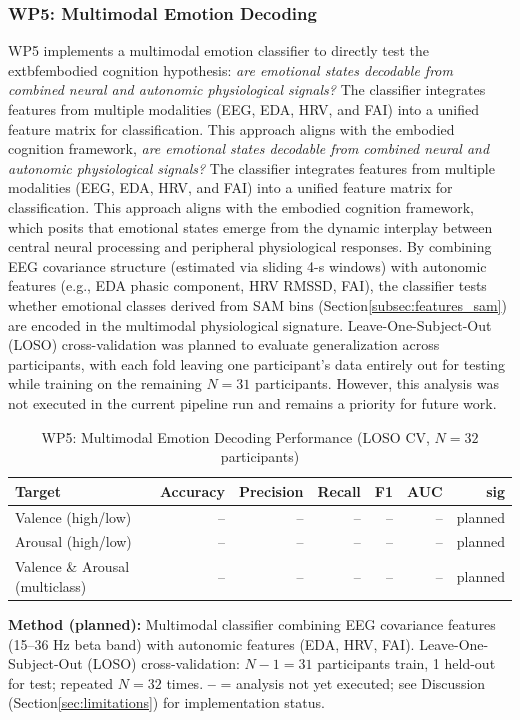 \subsubsection{WP5: Multimodal Emotion Decoding}
\label{subsec:wp5_multimodal_decoding}

WP5 implements a multimodal emotion classifier to directly test the 	extbf{embodied cognition hypothesis}: \emph{are emotional states decodable from combined neural and autonomic physiological signals?} The classifier integrates features from multiple modalities (EEG, EDA, HRV, and FAI) into a unified feature matrix for classification. This approach aligns with the embodied cognition framework, \emph{are emotional states decodable from combined neural and autonomic physiological signals?} The classifier integrates features from multiple modalities (EEG, EDA, HRV, and FAI) into a unified feature matrix for classification. This approach aligns with the embodied cognition framework, which posits that emotional states emerge from the dynamic interplay between central neural processing and peripheral physiological responses. By combining EEG covariance structure (estimated via sliding 4-s windows) with autonomic features (e.g., EDA phasic component, HRV RMSSD, FAI), the classifier tests whether emotional classes derived from SAM bins (Section\ref{subsec:features_sam}) are encoded in the multimodal physiological signature. Leave-One-Subject-Out (LOSO) cross-validation was planned to evaluate generalization across participants, with each fold leaving one participant's data entirely out for testing while training on the remaining $N=31$ participants. However, this analysis was not executed in the current pipeline run and remains a priority for future work.

\begin{table}[htbp]
    \centering
    \caption{WP5: Multimodal Emotion Decoding Performance (LOSO CV, $N = 32$ participants)}
    \label{tab:wp5_multimodal_decoding}
    \small
    \begin{tabular}{lrrrrrr}
        \hline
        \textbf{Target} & \textbf{Accuracy} & \textbf{Precision} & \textbf{Recall} & \textbf{F1} & \textbf{AUC} & \textbf{sig} \\
        \hline
        Valence (high/low) & -- & -- & -- & -- & -- & \multicolumn{1}{l}{planned} \\
        Arousal (high/low) & -- & -- & -- & -- & -- & \multicolumn{1}{l}{planned} \\
        Valence \& Arousal (multiclass) & -- & -- & -- & -- & -- & \multicolumn{1}{l}{planned} \\
        \hline
    \end{tabular}
    \par\vspace{4pt}
    \noindent\parbox{\linewidth}{\scriptsize \textbf{Method (planned):} Multimodal classifier combining EEG covariance features (15--36 Hz beta band) with autonomic features (EDA, HRV, FAI). Leave-One-Subject-Out (LOSO) cross-validation: $N-1 = 31$ participants train, 1 held-out for test; repeated $N = 32$ times. \textbf{--} = analysis not yet executed; see Discussion (Section\ref{sec:limitations}) for implementation status.}
\end{table}


